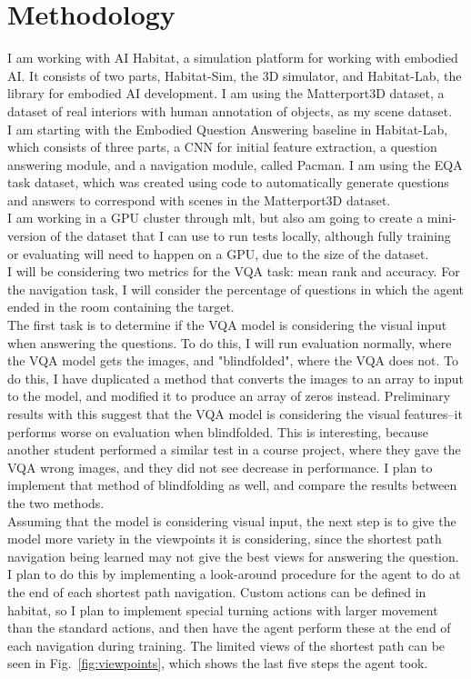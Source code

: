 \documentclass{article}
\begin{document}
\section{Methodology}
I am working with AI Habitat, a simulation platform for working with embodied AI\cite{habitat19iccv}. It consists of two parts, Habitat-Sim, the 3D simulator, and Habitat-Lab, the library for embodied AI development. I am using the Matterport3D dataset, a dataset of real interiors with human annotation of objects, as my scene dataset\cite{matterport}. \\
I am starting with the Embodied Question Answering baseline in Habitat-Lab, which consists of three parts, a CNN for initial feature extraction, a question answering module, and a navigation module, called Pacman\cite{embodiedqa}. I am using the EQA task dataset, which was created using code to automatically generate questions and answers to correspond with scenes in the Matterport3D dataset\cite{eqa_matterport}. \\
I am working in a GPU cluster through mlt, but also am going to create a mini-version of the dataset that I can use to run tests locally, although fully training or evaluating will need to happen on a GPU, due to the size of the dataset. \\
I will be considering two metrics for the VQA task: mean rank and accuracy. For the navigation task, I will consider the percentage of questions in which the agent ended in the room containing the target. \\
The first task is to determine if the VQA model is considering the visual input when answering the questions. To do this, I will run evaluation normally, where the VQA model gets the images, and "blindfolded", where the VQA does not. To do this, I have duplicated a method that converts the images to an array to input to the model, and modified it to produce an array of zeros instead. Preliminary results with this suggest that the VQA model is considering the visual features--it performs worse on evaluation when blindfolded. This is interesting, because another student performed a similar test in a course project, where they gave the VQA wrong images, and they did not see decrease in performance. I plan to implement that method of blindfolding as well, and compare the results between the two methods. \\
Assuming that the model is considering visual input, the next step is to give the model more variety in the viewpoints it is considering, since the shortest path navigation being learned may not give the best views for answering the question\cite{blindfolded}. I plan to do this by implementing a look-around procedure for the agent to do at the end of each shortest path navigation. Custom actions can be defined in habitat, so I plan to implement special turning actions with larger movement than the standard actions, and then have the agent perform these at the end of each navigation during training. The limited views of the shortest path can be seen in Fig.~\ref{fig:viewpoints}, which shows the last five steps the agent took.
\end{document}
